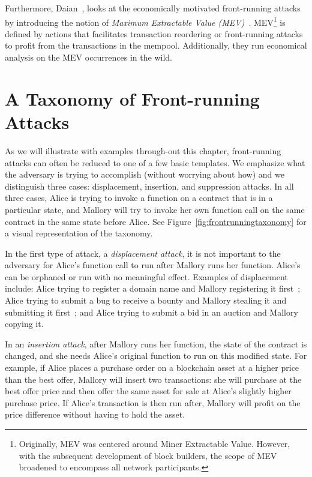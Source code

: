 Furthermore, Daian~\etal, looks at the economically motivated front-running attacks by introducing the notion of \textit{Maximum Extractable Value (MEV)}~\cite{daian2019flash}. MEV\footnote{Originally, MEV was centered around Miner Extractable Value. However, with the subsequent development of block builders, the scope of MEV broadened to encompass all network participants.} is defined by actions that facilitates transaction reordering or front-running attacks to profit from the transactions in the mempool. Additionally, they run economical analysis on the MEV occurrences in the wild. 




\section{A Taxonomy of Front-running Attacks}
\label{sec:taxonomy}

As we will illustrate with examples through-out this chapter, front-running attacks can often be reduced to one of a few basic templates. We emphasize what the adversary is trying to accomplish (without worrying about how) and we distinguish three cases: displacement, insertion, and suppression attacks. In all three cases, Alice is trying to invoke a function on a contract that is in a particular state, and Mallory will try to invoke her own function call on the same contract in the same state before Alice. See Figure~\ref{fig:frontrunningtaxonomy} for a visual representation of the taxonomy.

In the first type of attack, a \textit{displacement attack}, it is not important to the adversary for Alice's function call to run after Mallory runs her function. Alice's can be orphaned or run with no meaningful effect. Examples of displacement include: Alice trying to register a domain name and Mallory registering it first~\cite{kalodner2015empirical}; Alice trying to submit a bug to receive a bounty and Mallory stealing it and submitting it first~\cite{breidenbach2018enter}; and Alice trying to submit a bid in an auction and Mallory copying it. 

In an \textit{insertion attack}, after Mallory runs her function, the state of the contract is changed, and she needs Alice's original function to run on this modified state. For example, if Alice places a purchase order on a blockchain asset at a higher price than the best offer, Mallory will insert two transactions: she will purchase at the best offer price and then offer the same asset for sale at Alice's slightly higher purchase price. If Alice's transaction is then run after, Mallory will profit on the price difference without having to hold the asset.

